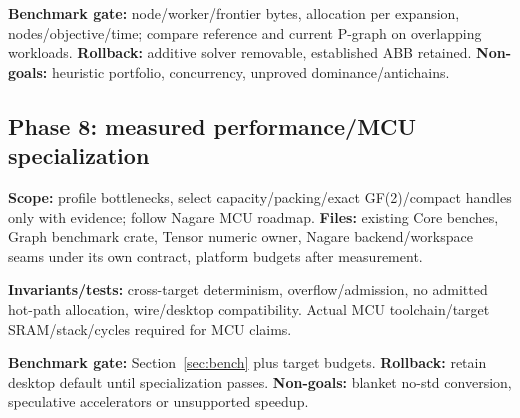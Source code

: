 \documentclass[10pt,a4paper]{article}
\begin{document}
\textbf{Benchmark gate:} node/worker/frontier bytes, allocation per expansion, nodes/objective/time; compare reference and current P-graph on overlapping workloads. \textbf{Rollback:} additive solver removable, established ABB retained. \textbf{Non-goals:} heuristic portfolio, concurrency, unproved dominance/antichains.

\subsection{Phase 8: measured performance/MCU specialization}
\textbf{Scope:} profile bottlenecks, select capacity/packing/exact GF(2)/compact handles only with evidence; follow Nagare MCU roadmap. \textbf{Files:} existing Core benches, Graph benchmark crate, Tensor numeric owner, Nagare backend/workspace seams under its own contract, platform budgets after measurement.

\textbf{Invariants/tests:} cross-target determinism, overflow/admission, no admitted hot-path allocation, wire/desktop compatibility. Actual MCU toolchain/target SRAM/stack/cycles required for MCU claims.

\textbf{Benchmark gate:} Section~\ref{sec:bench} plus target budgets. \textbf{Rollback:} retain desktop default until specialization passes. \textbf{Non-goals:} blanket no-std conversion, speculative accelerators or unsupported speedup.
\end{document}
